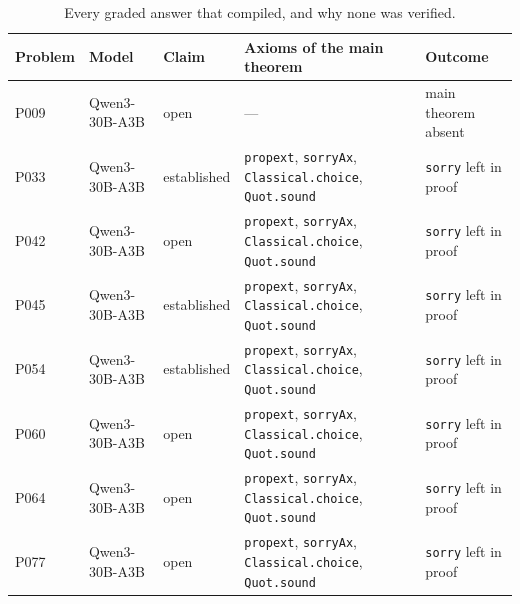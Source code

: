 \documentclass[11pt]{article}
\begin{document}
\begin{table}[!htbp]
\centering
\caption{Every graded answer that compiled, and why none was verified.}
\label{tab:compiled}
\small
\begin{tabular}{@{}lll>{\raggedright\arraybackslash}p{4.6cm}l@{}}
\toprule
Problem & Model & Claim & Axioms of the main theorem & Outcome \\
\midrule
P009 & Qwen3-30B-A3B & open & --- & main theorem absent \\
P033 & Qwen3-30B-A3B & established & \texttt{propext}, \texttt{sorryAx}, \texttt{Classical.choice}, \texttt{Quot.sound} & \texttt{sorry} left in proof \\
P042 & Qwen3-30B-A3B & open & \texttt{propext}, \texttt{sorryAx}, \texttt{Classical.choice}, \texttt{Quot.sound} & \texttt{sorry} left in proof \\
P045 & Qwen3-30B-A3B & established & \texttt{propext}, \texttt{sorryAx}, \texttt{Classical.choice}, \texttt{Quot.sound} & \texttt{sorry} left in proof \\
P054 & Qwen3-30B-A3B & established & \texttt{propext}, \texttt{sorryAx}, \texttt{Classical.choice}, \texttt{Quot.sound} & \texttt{sorry} left in proof \\
P060 & Qwen3-30B-A3B & open & \texttt{propext}, \texttt{sorryAx}, \texttt{Classical.choice}, \texttt{Quot.sound} & \texttt{sorry} left in proof \\
P064 & Qwen3-30B-A3B & open & \texttt{propext}, \texttt{sorryAx}, \texttt{Classical.choice}, \texttt{Quot.sound} & \texttt{sorry} left in proof \\
P077 & Qwen3-30B-A3B & open & \texttt{propext}, \texttt{sorryAx}, \texttt{Classical.choice}, \texttt{Quot.sound} & \texttt{sorry} left in proof \\
\bottomrule
\end{tabular}
\end{table}

\clearpage
\end{document}

